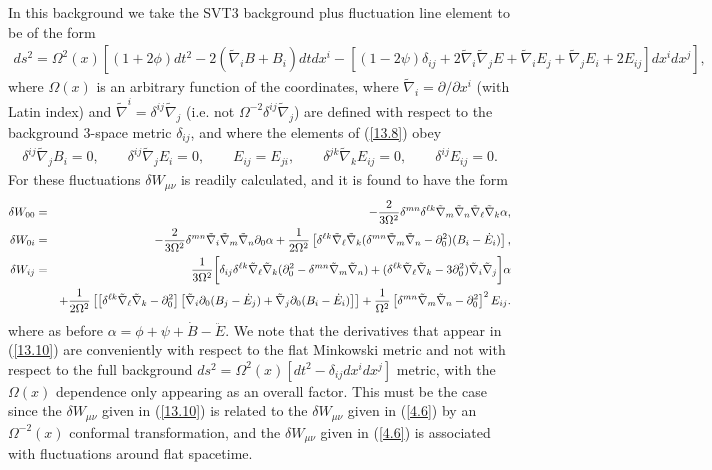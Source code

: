 \documentclass[aps,onecolumn,10pt]{revtex4}
\numberwithin{equation}{section}
\numberwithin{equation}{section}
\begin{document}
In this background we take the SVT3  background plus fluctuation line element to be of the form
%
\begin{eqnarray}
ds^2 = \Omega^2(x) \left[ (1+2\phi) dt^2 -2(\tilde{\nabla}_i B +B_i)dt dx^i - [(1-2\psi)\delta_{ij} +2\tilde{\nabla}_i\tilde{\nabla}_j E + \tilde{\nabla}_i E_j + \tilde{\nabla}_j E_i + 2E_{ij}]dx^i dx^j\right],
\label{13.8}
\end{eqnarray}
%
where $\Omega(x)$ is an arbitrary function of the coordinates, where $\tilde{\nabla}_i=\partial/\partial x^i$ (with Latin index) and  $\tilde{\nabla}^i=\delta^{ij}\tilde{\nabla}_j$ (i.e. not $\Omega^{-2}\delta^{ij}\tilde{\nabla}_j$) are defined with respect to the background 3-space metric $\delta_{ij}$, and where the elements of (\ref{13.8}) obey
%
\begin{eqnarray}
\delta^{ij}\tilde{\nabla}_j B_i = 0,\qquad \delta^{ij}\tilde{\nabla}_j E_i = 0, \qquad E_{ij}=E_{ji},\qquad \delta^{jk}\tilde{\nabla}_kE_{ij} = 0, \qquad \delta^{ij}E_{ij} = 0.
\label{13.9}
\end{eqnarray}
%
For these fluctuations $\delta W_{\mu\nu}$ is readily calculated, and it is found to have the form \cite{Amarasinghe2018} 
%
\begin{eqnarray}
\delta W_{00}  &=& -\frac{2}{3\Omega^2} \delta^{mn}\delta^{\ell k}\tilde{\nabla}_m\tilde{\nabla}_n\tilde{\nabla}_{\ell}\tilde{\nabla}_k \alpha,
\nonumber\\	
\delta W_{0i} &=&  -\frac{2}{3\Omega^2} \delta^{mn}\tilde{\nabla}_i\tilde{\nabla}_m\tilde{\nabla}_n\partial_0\alpha
	+\frac{1}{2\Omega^2}\left[\delta^{\ell k}\tilde{\nabla}_{\ell}\tilde{\nabla}_k(\delta^{mn}\tilde{\nabla}_m\tilde{\nabla}_n-\partial_0^2)(B_i - \dot{E}_i)\right],
\nonumber\\	
\delta W_{ij}  &=& \frac{1}{3\Omega^2}\bigg{[} \delta_{ij}\delta^{\ell k}\tilde{\nabla}_{\ell}\tilde{\nabla}_k (\partial_0^2 - \delta^{mn}\tilde{\nabla}_m\tilde{\nabla}_n) 
+(\delta^{\ell k}\tilde{\nabla}_{\ell}\tilde{\nabla}_k -3\partial_0^2)\tilde{\nabla}_i\tilde{\nabla}_j  
\bigg{] }\alpha
\nonumber\\
&&+\frac{1}{2\Omega^2}\left[ \left[\delta^{\ell k}\tilde{\nabla}_{\ell}\tilde{\nabla}_k -\partial_0^2\right]\left[\tilde{\nabla}_i   \partial_0(B_j - \dot{E}_j)+ \tilde{\nabla}_j \partial_0(B_i - \dot{E}_i)\right] \right]
+\frac{1}{\Omega^2}\left[\delta^{mn}\tilde{\nabla}_m\tilde{\nabla}_n-\partial_0^2\right]^2E_{ij}.
\label{13.10}
\end{eqnarray}
%
where as before $\alpha=\phi + \psi +\dot{B}-\ddot{E}$. We note that the derivatives that appear in (\ref{13.10}) are conveniently with respect to the flat Minkowski metric and not with respect to the full background $ds^2=\Omega^2(x)[dt^2-\delta_{ij}dx^idx^j]$ metric, with the $\Omega(x)$ dependence only appearing as an overall factor. This must be the case since the $\delta W_{\mu\nu}$ given in (\ref{13.10}) is related to the $\delta W_{\mu\nu}$ given in (\ref{4.6}) by an $\Omega^{-2}(x)$  conformal transformation, and the $\delta W_{\mu\nu}$ given in (\ref{4.6}) is associated with fluctuations around flat spacetime.
\end{document}

